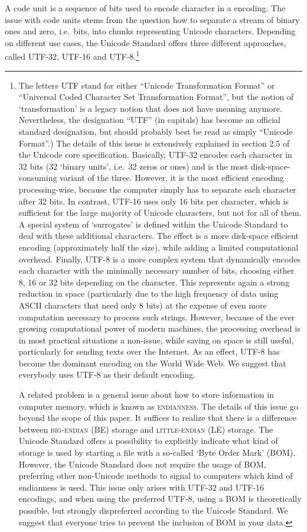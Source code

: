 {{{{{{{{{{{{{{{{{{{{{{{{{{{{{A code unit is a sequence of bits used to encode character in a encoding. The issue with code units stems from the question how to separate a stream of binary ones and zero, i.e.~bits, into chunks representing Unicode characters. Depending on different use cases, the Unicode Standard offers three different approaches, called UTF-32, UTF-16 and UTF-8.\footnote{The letters UTF stand for either ``Unicode Transformation Format'' or ``Universal Coded Character Set Transformation Format'', but the notion of `transformation' is a legacy notion that does not have meaning anymore. Nevertheless, the designation ``UTF'' (in capitals) has become an official standard designation, but should probably best be read as simply ``Unicode Format''.) The details of this issue is extensively explained in section 2.5 of the Unicode core specification. Basically, \textsc{UTF-32} encodes each character in 32 bits (32 `binary units', i.e.~32 zeros or ones) and is the most disk-space-consuming variant of the three. However, it is the most efficient encoding processing-wise, because the computer simply has to separate each character after 32 bits. In contrast, \textsc{UTF-16} uses only 16 bits per character, which is sufficient for the large majority of Unicode characters, but not for all of them. A special system of `surrogates' is defined within the Unicode Standard to deal with these additional characters. The effect is a more disk-space efficient encoding (approximately half the size), while adding a limited computational overhead. Finally, \textsc{UTF-8} is a more complex system that dynamically encodes each character with the minimally necessary number of bits, choosing either 8, 16 or 32 bits depending on the character. This represents again a strong reduction in space (particularly due to the high frequency of data using ASCII characters that need only 8 bits) at the expense of even more computation necessary to process such strings. However, because of the ever growing computational power of modern machines, the processing overhead is in most practical situations a non-issue, while saving on space is still useful, particularly for sending texts over the Internet. As an effect, UTF-8 has become the dominant encoding on the World Wide Web. We suggest that everybody uses UTF-8 as their default encoding.

A related problem is a general issue about how to store information in computer memory, which is known as \textsc{endianness}. The details of this issue go beyond the scope of this paper. It suffices to realize that there is a difference between \textsc{big-endian} (BE) storage and \textsc{little-endian} (LE) storage. The Unicode Standard offers a possibility to explicitly indicate what kind of storage is used by starting a file with a so-called `Byte Order Mark' (BOM). However, the Unicode Standard does not require the usage of BOM, preferring other non-Unicode methods to signal to computers which kind of endianness is used. This issue only arises with UTF-32 and UTF-16 encodings, and when using the preferred UTF-8, using a BOM is theoretically possible, but strongly dispreferred according to the Unicode Standard. We suggest that everyone tries to prevent the inclusion of BOM in your data.

}}}}}}}}}}}}}}}}}}}}}}}}}}}}}}
